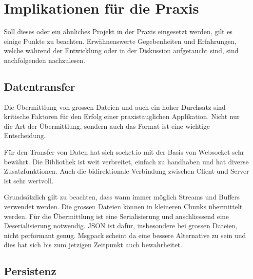 
\section{Implikationen für die Praxis}

Soll dieses oder ein ähnliches Projekt in der Praxis eingesetzt werden, gilt es einige Punkte zu beachten. Erwähnenswerte Gegebenheiten und Erfahrungen, welche während der Entwicklung oder in der Diskussion aufgetaucht sind, sind nachfolgenden nachzulesen.

\subsection{Datentransfer}

Die Übermittlung von grossen Dateien und auch ein hoher Durchsatz sind kritische Faktoren für den Erfolg einer praxistauglichen Applikation. Nicht nur die Art der Übermittlung, sondern auch das Format ist eine wichtige Entscheidung. 

Für den Transfer von Daten hat sich socket.io mit der Basis von Websocket sehr bewährt. Die Bibliothek ist weit verbreitet, einfach zu handhaben und hat diverse Zusatzfunktionen. Auch die bidirektionale Verbindung zwischen Client und Server ist sehr wertvoll.

Grundsätzlich gilt zu beachten, dass wann immer möglich Streams und Buffers verwendet werden. Die grossen Dateien können in kleineren Chunks übermittelt werden. Für die Übermittlung ist eine Serialisierung und anschliessend eine Deserialisierung notwendig.
JSON ist dafür, insbesondere bei grossen Dateien, nicht performant genug. Msgpack scheint da eine bessere Alternative zu sein und dies hat sich bis zum jetzigen Zeitpunkt auch bewahrheitet.

\subsection{Persistenz}

